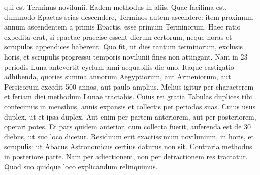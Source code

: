 qui est Terminus novilunii.
Eadem methodus in aliis.
Quae facilima
est, dummodo Epactas scias descendere, Terminos autem ascendere:
item proximum annum ascendentem a primis Epactis, esse primum
Terminorum.
%
Haec ratio expedita erat, si epactae praecise essent
dierum certorum, neque horas et scrupulos appendices haberent.
Quo fit, ut dies tantum %
 terminorum, exclusis horis, et scrupulis progressu
temporis novilunii fines non attingant.
Nam in 23 periodis Luna
antevertit cyclum anni aequabilis die uno.
Itaque castigatio adhibenda,
quoties summa annorum Aegyptiorum, aut Armeniorum,
aut Persicorum excedit 500 annos, aut paulo amplius.
Melius igitur
per characterem et feriam diei methodum
Lunae tractabis.
Cuius rei
gratia Tabulas duplices tibi confecimus
in mensibus, annis expansis
et collectis per periodos suas.
Cuius usus duplex, ut et ipsa duplex.
Aut enim per partem anteriorem,
aut per posteriorem, operari
potes.
%
Et pars quidem anterior, cum collecta fuerit, auferenda
est de 30 diebus, ut suo loco dicetur.
Residuum erit exactissimum
novilunium, in horis, et scrupulis: ut Abacus Astronomicus certius
daturus non sit.
Contraria methodus in posteriore parte.
Nam
per adiectionem, non per detractionem res tractatur.
Quod suo quidque
loco explicandum relinquimus.
%
